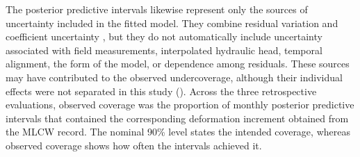 The posterior predictive intervals likewise represent only the sources of uncertainty included in the fitted model. They combine residual variation and coefficient uncertainty \citep{gelman_bayesian_2013, gneiting_probabilistic_2007}, but they do not automatically include uncertainty associated with field measurements, interpolated hydraulic head, temporal alignment, the form of the model, or dependence among residuals. These sources may have contributed to the observed undercoverage, although their individual effects were not separated in this study (). Across the three retrospective evaluations, observed coverage was the proportion of monthly posterior predictive intervals that contained the corresponding deformation increment obtained from the MLCW record. The nominal 90\% level states the intended coverage, whereas observed coverage shows how often the intervals achieved it.

